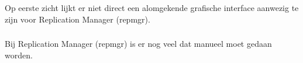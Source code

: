 Op eerste zicht lijkt er niet direct een alomgekende grafische interface aanwezig te zijn voor Replication Manager (repmgr).

\subsubsection{}
\label{subsubsec:Beperkte manuele interventie}

Bij Replication Manager (repmgr) is er nog veel dat manueel moet gedaan worden.
